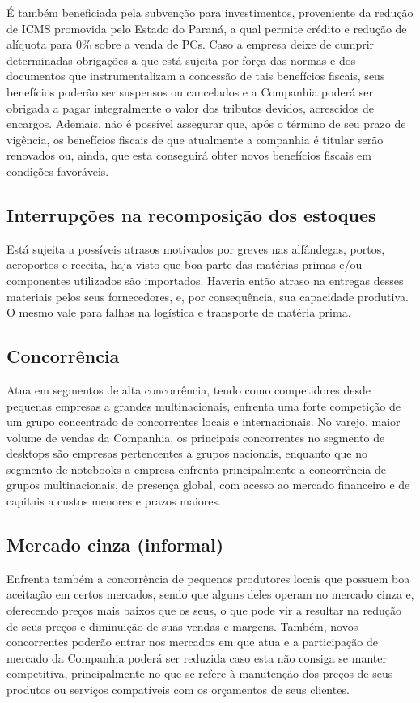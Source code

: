 É também beneficiada pela subvenção para investimentos, proveniente da redução de ICMS promovida pelo Estado do Paraná, a qual permite crédito e redução de alíquota para 0\% sobre a venda de PCs. Caso a empresa deixe de cumprir determinadas obrigações a que está sujeita por força das normas e dos documentos que instrumentalizam a concessão de tais benefícios fiscais, seus benefícios poderão ser suspensos ou cancelados e a Companhia poderá ser obrigada a pagar integralmente o valor dos tributos devidos, acrescidos de encargos. Ademais, não é possível assegurar que, após o término de seu prazo de vigência, os benefícios fiscais de que atualmente a companhia é titular serão renovados ou, ainda, que esta conseguirá obter novos benefícios fiscais em condições favoráveis. 

\subsection{Interrupções na recomposição dos estoques}
Está sujeita a possíveis atrasos motivados por greves nas alfândegas, portos, aeroportos e receita, haja visto que boa parte das matérias primas e/ou componentes utilizados são importados. Haveria então atraso na entregas desses materiais pelos seus fornecedores, e, por consequência, sua capacidade produtiva. O mesmo vale para falhas na logística e transporte de matéria prima.

\subsection{Concorrência} 
Atua em segmentos de alta concorrência, tendo como competidores desde pequenas empresas a grandes multinacionais, enfrenta uma forte competição de um grupo concentrado de concorrentes locais e internacionais. No varejo, maior volume de vendas da Companhia, os principais concorrentes no segmento de desktops são empresas pertencentes a grupos nacionais, enquanto que no segmento de notebooks a empresa enfrenta principalmente a concorrência de grupos multinacionais, de presença global, com acesso ao mercado financeiro e de capitais a custos menores e prazos maiores.

\subsection{Mercado cinza (informal)}
Enfrenta também a concorrência de pequenos produtores locais que possuem boa aceitação em certos mercados, sendo que alguns deles operam no mercado cinza e, oferecendo preços mais baixos que os seus, o que pode vir a resultar na redução de seus preços e diminuição de suas vendas e margens. Também, novos concorrentes poderão entrar nos mercados em que atua e a participação de mercado da Companhia poderá ser reduzida caso esta não consiga se manter competitiva, principalmente no que se refere à manutenção dos preços de seus produtos ou serviços compatíveis com os orçamentos de seus clientes.

